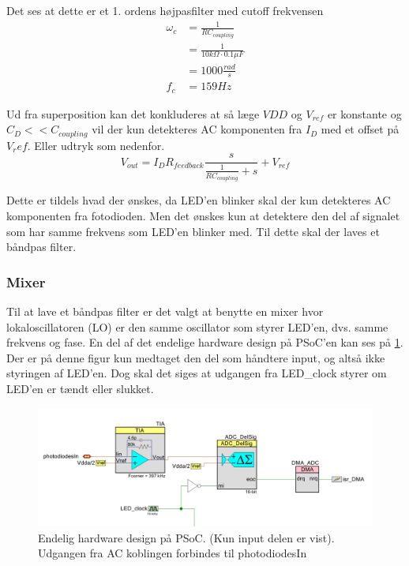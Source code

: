 \documentclass[HardwareDesign/HardwareDesign_main.tex]{subfiles}
\begin{document}
Det ses at dette er et 1. ordens højpasfilter med cutoff frekvensen 
\begin{align}
\omega_c &= \frac{1}{RC_{coupling} }\\
&= \frac{1}{10\si{k\Omega} \cdot 0.1\si{\mu F}}\\
&= 1000 \si{\frac{rad}{s}}\\
f_c &= 159 \si{Hz}
\end{align}

Ud fra superposition kan det konkluderes at så læge $VDD$ og $V_{ref}$ er konstante og $C_D << C_{coupling}$ vil der kun detekteres AC komponenten fra $I_D$ med et offset på $V_ref$. Eller udtryk som nedenfor.
$$V_{out} = I_D R_{feedback} \frac{s}{\frac{1}{R C_{coupling}} + s} + V_{ref}$$

Dette er tildels hvad der ønskes, da LED'en blinker skal der kun detekteres AC komponenten fra fotodioden. Men det ønskes kun at detektere den del af signalet som har samme frekvens som LED'en blinker med. Til dette skal der laves et båndpas filter.

\subsubsection{Mixer}
Til at lave et båndpas filter er det valgt at benytte en mixer hvor lokaloscillatoren (LO) er den samme oscillator som styrer LED'en, dvs. samme frekvens og fase. En del af det endelige hardware design på PSoC'en kan ses på \ref{fig:final_PSoC_design_input_part}. Der er på denne figur kun medtaget den del som håndtere input, og altså ikke styringen af LED'en. Dog skal det siges at udgangen fra LED\_clock styrer om LED'en er tændt eller slukket.

\begin{figure}[H]
    \centering
    \includegraphics[width=1\textwidth]{HardwareDesign/CupSensor/graphics/Final_PSoC_Design_Input_part.PNG}
    \caption{Endelig hardware design på PSoC. (Kun input delen er vist). Udgangen fra AC koblingen forbindes til photodiodesIn}
    \label{fig:final_PSoC_design_input_part}
\end{figure}
\end{document}
